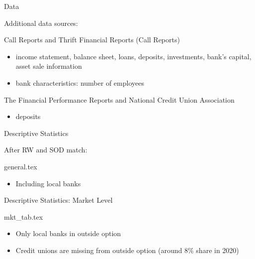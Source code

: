\documentclass[notes,11pt, aspectratio=169]{beamer}
\newenvironment{wideitemize}{\itemize\addtolength{\itemsep}{10pt}}{\enditemize}
\begin{document}
    \begin{frame}{Data}

    Additional data sources:
    \vspace{0.3cm}
    \begin{wideitemize}
      \item Call Reports and Thrift Financial Reports (Call Reports)
        
      \begin{itemize}
          \item income statement, balance sheet, loans, deposits, investments,  bank's capital, asset sale information
          \item bank characteristics: number of employees
        
          
      \end{itemize}

      \item The Financial Performance Reports and National Credit Union Association
        \begin{itemize}
          \item deposits 
      \end{itemize}
    \end{wideitemize}

  \end{frame}


\begin{frame}{Descriptive Statistics}

  After RW and SOD match:
  \begin{table}[h]
  {general.tex}
  \end{table}

  \begin{itemize}
    \item Including local banks
  \end{itemize}
\end{frame}


\begin{frame}{Descriptive Statistics: Market Level}


  \begin{table}[h]
  {mkt_tab.tex}
  \end{table}

  \begin{itemize}
    \item Only local banks in outside option
    \item Credit unions are missing from outside option (around 8\% share in 2020)
  \end{itemize}
\end{frame}
\end{document}
